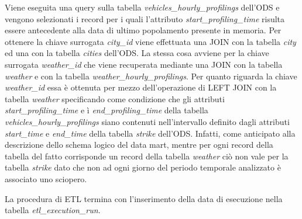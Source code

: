 Viene eseguita una query sulla tabella \textit{vehicles\_hourly\_profilings}
dell'ODS e vengono selezionati i record per i quali l'attributo
\textit{start\_profiling\_time} risulta essere antecedente alla data di ultimo
popolamento presente in memoria. Per ottenere la chiave surrogata \textit{city\_id}
viene effettuata una JOIN con la tabella \textit{city} ed una con la tabella
\textit{cities} dell'ODS. La stessa cosa avviene per la chiave surrogata
\textit{weather\_id} che viene recuperata mediante una JOIN con la tabella
\textit{weather} e con la tabella \textit{weather\_hourly\_profilings}.
Per quanto riguarda la chiave \textit{weather\_id} essa è ottenuta per mezzo
dell'operazione di LEFT JOIN con la tabella \textit{weather} specificando
come condizione che gli attributi \textit{start\_profiling\_time} e ì
\textit{end\_profiling\_time} della tabella \textit{vehicles\_hourly\_profilings}
siano contenuti nell'intervallo definito dagli attributi \textit{start\_time} e
\textit{end\_time} della tabella \textit{strike} dell'ODS. Infatti, come anticipato
alla descrizione dello schema logico del data mart, mentre per ogni record della
tabella del fatto corrisponde un record della tabella \textit{weather} ciò non
vale per la tabella \textit{strike} dato che non ad ogni giorno del periodo
temporale analizzato è associato uno sciopero.

La procedura di ETL termina con l'inserimento della data di esecuzione nella
tabella \textit{etl\_execution\_run}.
